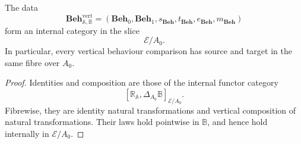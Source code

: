 \begin{theorem}
\label{thm:internal-behaviour-category}
    The data
    \[
        \mathbf{Beh}^{\mathrm{vert}}_{\mathbb A,\mathbb B}
        =
        \left(
            \mathbf{Beh}_0,
            \mathbf{Beh}_1,
            s_{\mathbf{Beh}},
            t_{\mathbf{Beh}},
            e_{\mathbf{Beh}},
            m_{\mathbf{Beh}}
        \right)
    \]
    form an internal category in the slice
    \[
        \mathcal E/A_0.
    \]
    In particular, every vertical behaviour comparison has source and target
    in the same fibre over \(A_0\).
\end{theorem}
\begin{proof}
    Identities and composition are those of the internal functor category
    \[
        [\mathbb R_{\mathbb A},\Delta_{A_0}\mathbb B]_{\mathcal E/A_0}.
    \]
    Fibrewise, they are identity natural transformations and vertical
    composition of natural transformations. Their laws hold pointwise in
    \(\mathbb B\), and hence hold internally in \(\mathcal E/A_0\).
\end{proof}

